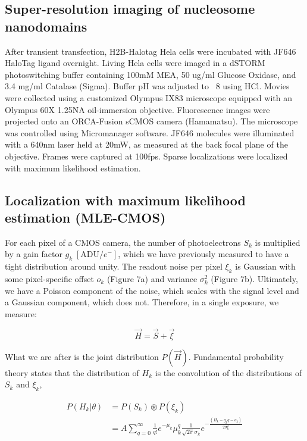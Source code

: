 \documentclass{ucetd}
\begin{document}
\subsection{Super-resolution imaging of nucleosome nanodomains}

After transient transfection, H2B-Halotag Hela cells were incubated with JF646 HaloTag ligand overnight. Living Hela cells were imaged in a dSTORM photoswitching buffer containing 100mM MEA, 50 ug/ml Glucose Oxidase, and 3.4 mg/ml Catalase (Sigma). Buffer pH was adjusted to ~8 using HCl. Movies were collected using a customized Olympus IX83 microscope equipped with an Olympus 60X 1.25NA oil-immersion objective. Fluorescence images were projected onto an ORCA-Fusion sCMOS camera (Hamamatsu). The microscope was controlled using Micromanager software. JF646 molecules were illuminated with a 640nm laser held at 20mW, as measured at the back focal plane of the objective.  Frames were captured at 100fps. Sparse localizations were localized with maximum likelihood estimation. 

\subsection{Localization with maximum likelihood estimation (MLE-CMOS)}

For each pixel of a CMOS camera, the number of photoelectrons $S_{k}$ is  multiplied by a gain factor $g_{k} \;[\mathrm{ADU}/e^{-}]$, which we have previously measured to have a tight distribution around unity. The readout noise per pixel $\xi_{k}$ is Gaussian with some pixel-specific offset $o_{k}$ (Figure 7a) and variance $\sigma_{k}^{2}$ (Figure 7b). Ultimately, we have a Poisson component of the noise, which scales with the signal level and a Gaussian component, which does not. Therefore, in a single exposure, we measure: 

\begin{equation}
\vec{H} = \vec{S} + \vec{\xi}
\end{equation}

What we are after is the joint distribution $P(\vec{H})$. Fundamental probability theory states that the distribution of $H_{k}$ is the convolution of the distributions of $S_{k}$ and $\xi_{k}$,

\begin{align}
P(H_{k}|\theta) &= P(S_{k})\circledast P(\xi_{k})\\
&= A\sum_{q=0}^{\infty} \frac{1}{q!}e^{-\mu_{k}}\mu_{k}^{q}\frac{1}{\sqrt{2\pi}\sigma_{k}}e^{-\frac{(H_{k}-g_{k}q-o_{k})}{2\sigma_{k}^{2}}}
\end{align}
\end{document}
